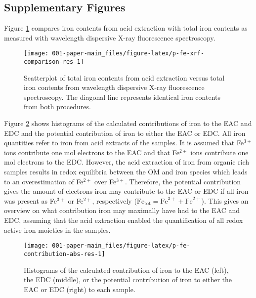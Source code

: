 \documentclass[alpha-refs, lineno]{wiley-article-rmd}
\begin{document}
\clearpage

\hypertarget{supplementary-figures}{%
\subsection{Supplementary Figures}\label{supplementary-figures}}

Figure \ref{fig:p-fe-xrf-comparison-res} compares iron contents from acid extraction with total iron contents as measured with wavelength dispersive X-ray fluorescence spectroscopy.

\begin{figure}[H]

{\centering \texttt{[image: 001-paper-main\_files/figure-latex/p-fe-xrf-comparison-res-1]}

}

\caption{Scatterplot of total iron contents from acid extraction versus total iron contents from wavelength dispersive X-ray fluorescence spectroscopy. The diagonal line represents identical iron contents from both procedures.}\label{fig:p-fe-xrf-comparison-res}
\end{figure}

Figure \ref{fig:p-fe-contribution-abs-res} shows histograms of the calculated contributions of iron to the EAC and EDC and the potential contribution of iron to either the EAC or EDC. All iron quantities refer to iron from acid extracts of the samples. It is assumed that Fe\(^{3+}\) ions contribute one mol electrons to the EAC and that Fe\(^{2+}\) ions contribute one mol electrons to the EDC. However, the acid extraction of iron from organic rich samples results in redox equilibria between the OM and iron species which leads to an overestimation of Fe\(^{2+}\) over Fe\(^{3+}\). Therefore, the potential contribution gives the amount of electrons iron may contribute to the EAC or EDC if all iron was present as Fe\(^{3+}\) or Fe\(^{2+}\), respectively (\(\text{Fe}_\text{tot}=\text{Fe}^{3+} + \text{Fe}^{2+}\)). This gives an overview on what contribution iron may maximally have had to the EAC and EDC, assuming that the acid extraction enabled the quantification of all redox active iron moieties in the samples.

\begin{figure}[H]

{\centering \texttt{[image: 001-paper-main\_files/figure-latex/p-fe-contribution-abs-res-1]}

}

\caption{Histograms of the calculated contribution of iron to the EAC (left), the EDC (middle), or the potential contribution of iron to either the EAC or EDC (right) to each sample.}\label{fig:p-fe-contribution-abs-res}
\end{figure}
\end{document}
